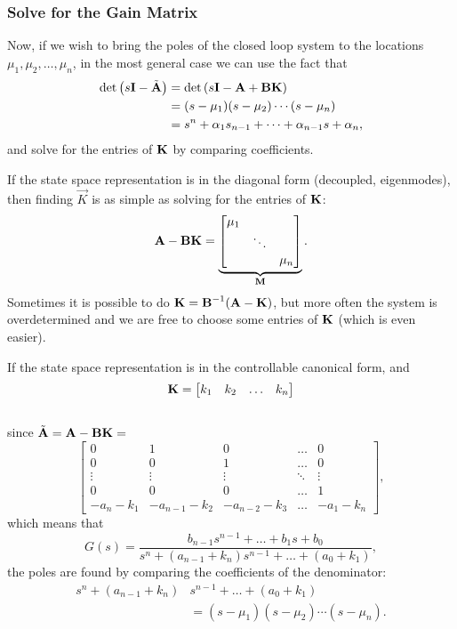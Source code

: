 \subsubsection{Solve for the Gain Matrix}

Now, if we wish to bring the poles of the closed loop system to the locations \(\mu_1, \mu_2, \ldots, \mu_n\), in the most general case we can use the fact that
\begin{align*}
	\det\left(s\bm{\mathrm{I}} - \tilde{\bm{\mathrm{A}}}\right)
		&= \det\left(s\bm{\mathrm{I}} - \bm{\mathrm{A}} + \bm{\mathrm{B}}\bm{\mathrm{K}}\right) \\
		&= (s - \mu_1)(s - \mu_2) \cdots (s - \mu_n) \\
		&= s^n + \alpha_1 s_{n-1} + \dots + \alpha_{n-1} s + \alpha_n,
\end{align*}
and solve for the entries of \(\bm{\mathrm{K}}\) by comparing coefficients.

If the state space representation is in the diagonal form (decoupled, eigenmodes), then finding \(\vec{K}\) is as simple as solving for the entries of \(\bm{\mathrm{K}}\):
\[
	\bm{\mathrm{A}} - \bm{\mathrm{B}} \bm{\mathrm{K}} =
	\underbrace{
		\begin{bmatrix}
			\mu_1 \\
			& \ddots \\
			& & \mu_n
		\end{bmatrix}
	}_{\bm{\mathrm{M}}}.
\]
Sometimes it is possible to do \(\bm{\mathrm{K}} = \bm{\mathrm{B}}^{-1} (\bm{\mathrm{A}} - \bm{\mathrm{K}})\), but more often the system is overdetermined and we are free to choose some entries of \(\bm{\mathrm{K}}\) (which is even easier).

If the state space representation is in the controllable canonical form, and 
\[
	\bm{\mathrm{K}} = \begin{bmatrix} k_1 & k_2 & \ldots & k_n \end{bmatrix}
\] \\
since \(\tilde{\bm{\mathrm{A}}} = \bm{\mathrm{A}} - \bm{\mathrm{B}}\bm{\mathrm{K}} = \)
{\small
	\[
		\begin{bmatrix}
			0 & 1 & 0 & \dots & 0 \\
			0 & 0 & 1 & \dots & 0 \\
			\vdots & \vdots & \vdots & \ddots & \vdots \\
			0 & 0 & 0 & \dots & 1 \\
			-a_n -k_1 & -a_{n-1} - k_2 & -a_{n-2} - k_3& \dots & -a_1 - k_n
		\end{bmatrix},
	\]
}
which means that
\[
	G(s) = \frac{
		b_{n-1} s^{n-1} + \dots + b_1 s + b_0
	}{
		s^n + (a_{n-1} + k_n) s^{n-1} + \dots + (a_0 + k_1)
	},
\]
the poles are found by comparing the coefficients of the denominator:
\begin{align*}
	s^n + (a_{n-1} + k_n) &s^{n-1} + \dots + (a_0 + k_1) \\
		&= (s - \mu_1)(s - \mu_2) \cdots (s - \mu_n).
\end{align*}

